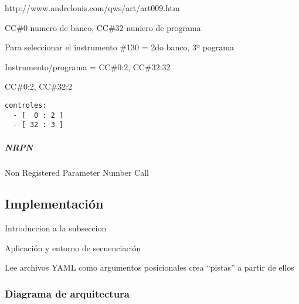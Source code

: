 \documentclass[]{article}
\let\oldsubparagraph\subparagraph
\renewcommand{\subparagraph}[1]{\oldsubparagraph{#1}\mbox{}}
\begin{document}
http://www.andrelouis.com/qws/art/art009.htm

CC\#0 numero de banco, CC\#32 numero de programa

Para seleccionar el instrumento \#130 = 2do banco, 3º pograma

Instrumento/programa = CC\#0:2, CC\#32:32

CC\#0:2, CC\#32:2

\begin{verbatim}
controles:
  - [  0 : 2 ]
  - [ 32 : 3 ]
\end{verbatim}

\hypertarget{nrpn}{%
\subparagraph{NRPN}\label{nrpn}}

Non Registered Parameter Number Call

\newpage

\hypertarget{implementaciuxf3n}{%
\subsection{Implementación}\label{implementaciuxf3n}}

Introduccion a la subseccion

Aplicación y entorno de secuenciación

Lee archivos YAML como argumentos posicionales crea ``pistas'' a partir
de ellos

\hypertarget{diagrama-de-arquitectura}{%
\subsubsection{Diagrama de
arquitectura}\label{diagrama-de-arquitectura}}
\end{document}
